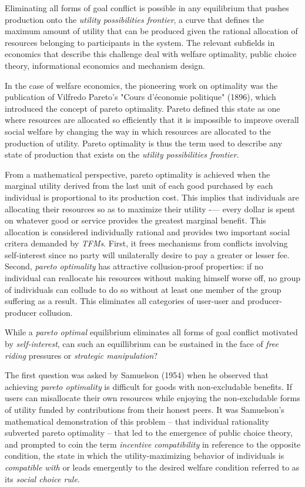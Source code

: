
Eliminating all forms of goal conflict is possible in any equilibrium that pushes production onto the \textit{utility possibilities frontier}, a curve that defines the maximum amount of utility that can be produced given the rational allocation of resources belonging to participants in the system. The relevant subfields in economics that describe this challenge deal with welfare optimality, public choice theory, informational economics and mechanism design.

In the case of welfare economics, the pioneering work on optimality was the publication of Vilfredo Pareto’s "Cours d'économie politique" (1896), which introduced the concept of pareto optimality. Pareto defined this state as one where resources are allocated so efficiently that it is impossible to improve overall social welfare by changing the way in which resources are allocated to the production of utility. Pareto optimality is thus the term used to describe any state of production that exists on the \textit{utility possibilities frontier}.

From a mathematical perspective, pareto optimality is achieved when the marginal utility derived from the last unit of each good purchased by each individual is proportional to its production cost. This implies that individuals are allocating their resources so as to maximize their utility -— every dollar is spent on whatever good or service provides the greatest marginal benefit. This allocation is considered individually rational and provides two important social critera demanded by \textit{TFMs}. First, it frees mechanisms from conflicts involving self-interest since no party will unilaterally desire to pay a greater or lesser fee. Second, \textit{pareto optimality} has attractive collusion-proof properties: if no individual can reallocate his resources without making himself worse off, no group of individuals can collude to do so without at least one member of the group suffering as a result. This eliminates all categories of user-user and producer-producer collusion.

While a \textit{pareto optimal} equilibrium eliminates all forms of goal conflict motivated by \textit{self-interest}, can such an equillibrium can be sustained in the face of \textit{free riding} pressures or \textit{strategic manipulation}?

The first question was asked by Samuelson (1954) when he observed that achieving \textit{pareto optimality} is difficult for goods with non-excludable benefits. If users can misallocate their own resources while enjoying the non-excludable forms of utility funded by contributions from their honest peers. It was Samuelson's mathematical demonstration of this problem -- that individual rationality subverted pareto optimality -- that led to the emergence of public choice theory, and prompted \citet{hurwicz1960optimality} to coin the term \textit{incentive compatibility} in reference to the opposite condition, the state in which the utility-maximizing behavior of individuals is \textit{compatible with} or leads emergently to the desired welfare condition referred to as its \textit{social choice rule}.

